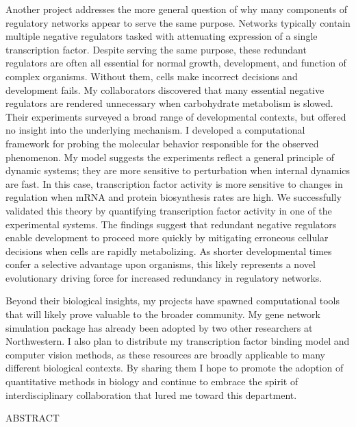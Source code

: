 Another project addresses the more general question of why many components of regulatory networks appear to serve the same purpose. Networks typically contain multiple negative regulators tasked with attenuating expression of a single transcription factor. Despite serving the same purpose, these redundant regulators are often all essential for normal growth, development, and function of complex organisms. Without them, cells make incorrect decisions and development fails. My collaborators discovered that many essential negative regulators are rendered unnecessary when carbohydrate metabolism is slowed. Their experiments surveyed a broad range of developmental contexts, but offered no insight into the underlying mechanism. I developed a computational framework for probing the molecular behavior responsible for the observed phenomenon. My model suggests the experiments reflect a general principle of dynamic systems; they are more sensitive to perturbation when internal dynamics are fast. In this case, transcription factor activity is more sensitive to changes in regulation when mRNA and protein biosynthesis rates are high. We successfully validated this theory by quantifying transcription factor activity in one of the experimental systems. The findings suggest that redundant negative regulators enable development to proceed more quickly by mitigating erroneous cellular decisions when cells are rapidly metabolizing. As shorter developmental times confer a selective advantage upon organisms, this likely represents a novel evolutionary driving force for increased redundancy in regulatory networks. 

Beyond their biological insights, my projects have spawned computational tools that will likely prove valuable to the broader community. My gene network simulation package has already been adopted by two other researchers at Northwestern. I also plan to distribute my transcription factor binding model and computer vision methods, as these resources are broadly applicable to many different biological contexts. By sharing them I hope to promote the adoption of quantitative methods in biology and continue to embrace the spirit of interdisciplinary collaboration that lured me toward this department.





ABSTRACT


